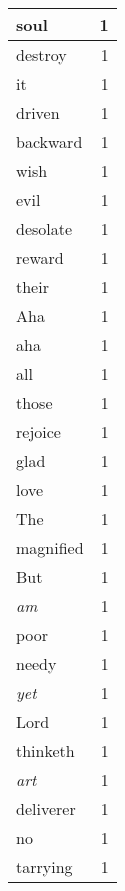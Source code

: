 \begin{center}
\begin{longtable}{l|r}
soul & 1 \\ \hline
destroy & 1 \\ \hline
it & 1 \\ \hline
driven & 1 \\ \hline
backward & 1 \\ \hline
wish & 1 \\ \hline
evil & 1 \\ \hline
desolate & 1 \\ \hline
reward & 1 \\ \hline
their & 1 \\ \hline
Aha & 1 \\ \hline
aha & 1 \\ \hline
all & 1 \\ \hline
those & 1 \\ \hline
rejoice & 1 \\ \hline
glad & 1 \\ \hline
love & 1 \\ \hline
The & 1 \\ \hline
magnified & 1 \\ \hline
But & 1 \\ \hline
\emph{am} & 1 \\ \hline
poor & 1 \\ \hline
needy & 1 \\ \hline
\emph{yet} & 1 \\ \hline
Lord & 1 \\ \hline
thinketh & 1 \\ \hline
\emph{art} & 1 \\ \hline
deliverer & 1 \\ \hline
no & 1 \\ \hline
tarrying & 1 \\ \hline
\end{longtable}
\end{center}



\normalsize



